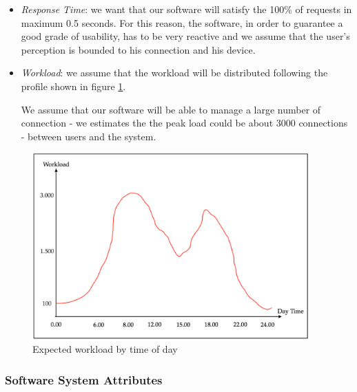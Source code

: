 \documentclass[english]{article}
\begin{document}
\begin{itemize}

  \item{\textit{Response Time}: we want that our software will satisfy the 100\% of requests in maximum 0.5 seconds.
  For this reason, the software, in order to guarantee a good grade of usability, has to be very reactive
  and we assume that the user's perception is bounded to his connection and his device.}

  \item{\textit{Workload}: we assume that the workload will be distributed following the profile shown in figure \ref{workload}.
  	
  	We assume that our software will be able to manage a large number of connection
  	- we estimates the the peak load could be about 3000 connections - between users and the system.}
\end{itemize}

\begin{figure}[H]
	\centering
	\includegraphics[width=300pt]{workload_aggiornato.png}
	\caption{Expected workload by time of day}\label{workload}
\end{figure}

\newpage
\subsubsection{Software System Attributes}
\end{document}
